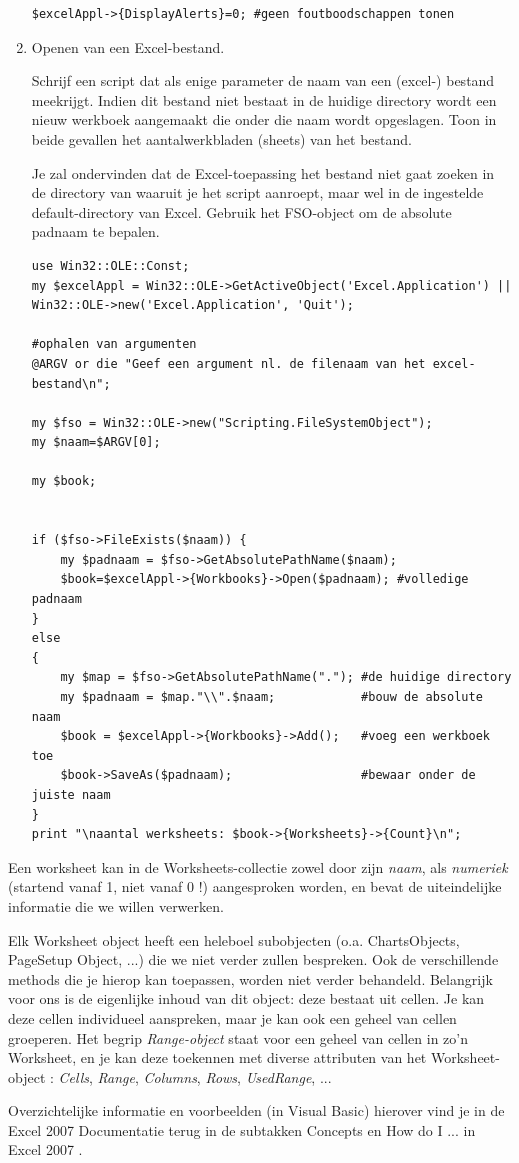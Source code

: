 \documentclass[11pt,a4paper]{report}
\begin{document}
\begin{enumerate}
\begin{lstlisting}
$excelAppl->{DisplayAlerts}=0; #geen foutboodschappen tonen 
\end{lstlisting}
	\item Openen van een Excel-bestand. 
	\par Schrijf een script dat als enige parameter de naam van een (excel-) bestand meekrijgt. Indien dit bestand niet bestaat in de huidige directory wordt een nieuw werkboek aangemaakt die onder die naam wordt opgeslagen. Toon in beide gevallen het aantalwerkbladen (sheets) van het bestand.
	\par Je zal ondervinden dat de Excel-toepassing het bestand niet gaat zoeken in de directory van waaruit je het script aanroept, maar wel in de ingestelde default-directory van Excel. Gebruik het FSO-object om de absolute padnaam te bepalen.
\begin{lstlisting}
use Win32::OLE::Const;
my $excelAppl = Win32::OLE->GetActiveObject('Excel.Application') || Win32::OLE->new('Excel.Application', 'Quit');

#ophalen van argumenten
@ARGV or die "Geef een argument nl. de filenaam van het excel-bestand\n";

my $fso = Win32::OLE->new("Scripting.FileSystemObject");
my $naam=$ARGV[0];

my $book;


if ($fso->FileExists($naam)) {
	my $padnaam = $fso->GetAbsolutePathName($naam);
	$book=$excelAppl->{Workbooks}->Open($padnaam); #volledige padnaam
}
else
{
	my $map = $fso->GetAbsolutePathName("."); #de huidige directory
	my $padnaam = $map."\\".$naam;            #bouw de absolute naam
	$book = $excelAppl->{Workbooks}->Add();   #voeg een werkboek toe
	$book->SaveAs($padnaam);                  #bewaar onder de juiste naam
}
print "\naantal werksheets: $book->{Worksheets}->{Count}\n";
\end{lstlisting}
\end{enumerate}
Een worksheet kan in de Worksheets-collectie zowel door zijn \textit{naam}, als \textit{numeriek} (startend vanaf 1, niet vanaf 0 !) aangesproken worden, en bevat de uiteindelijke informatie die we willen verwerken.
\par Elk Worksheet object heeft een heleboel subobjecten (o.a. ChartsObjects, PageSetup Object, ...) die we niet verder zullen bespreken. Ook de verschillende methods die je hierop kan toepassen, worden niet verder behandeld. Belangrijk voor ons is de eigenlijke inhoud van dit object: deze bestaat uit cellen. Je kan deze cellen individueel aanspreken, maar je kan ook een geheel van cellen groeperen. Het begrip \textit{Range-object} staat voor een geheel van cellen in zo'n Worksheet, en je kan deze toekennen met diverse attributen van het Worksheet-object : \textit{Cells}, \textit{Range}, \textit{Columns}, \textit{Rows}, \textit{UsedRange}, ...
\par Overzichtelijke informatie en voorbeelden (in Visual Basic) hierover vind je in de Excel 2007 Documentatie terug in de subtakken Concepts en How do I ... in Excel 2007 .
\end{document}

